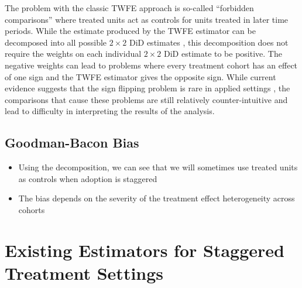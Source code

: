 \documentclass[12pt]{article}
\begin{document}
The problem with the classic TWFE approach is so-called ``forbidden comparisons'' where treated units act as controls for units treated in later time periods. While the estimate produced by the TWFE estimator can be decomposed into all possible $2\times2$ DiD estimates \parencite{goodman2021difference}, this decomposition does not require the weights on each individual $2\times 2$ DiD estimate to be positive. The negative weights can lead to problems where every treatment cohort has an effect of one sign and the TWFE estimator gives the opposite sign. While current evidence suggests that the sign flipping problem is rare in applied settings \parencite{chiu2026causal}, the comparisons that cause these problems are still relatively counter-intuitive and lead to difficulty in interpreting the results of the analysis.

\subsection{Goodman-Bacon Bias}

\begin{itemize}
    \item Using the decomposition, we can see that we will sometimes use treated units as controls when adoption is staggered
    \item The bias depends on the severity of the treatment effect heterogeneity across cohorts
\end{itemize}

\section{Existing Estimators for Staggered Treatment Settings}
\end{document}
